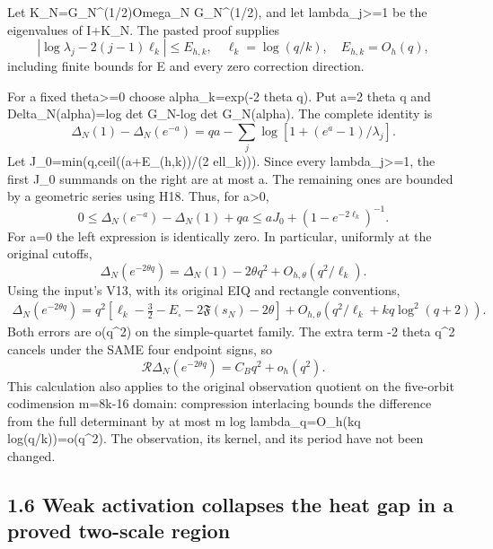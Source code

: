 Let K\_N=G\_N\^{}(1/2)Omega\_N G\_N\^{}(1/2), and let lambda\_j\textgreater=1 be the eigenvalues of I+K\_N. The pasted proof supplies \[
 |\log\lambda_j-2(j-1)\ell_k|\le E_{h,k},\quad
 \ell_k=\log(q/k),\quad E_{h,k}=O_h(q),
 \tag{H18}
\] including finite bounds for E and every zero correction direction.

For a fixed theta\textgreater=0 choose alpha\_k=exp(-2 theta q). Put a=2 theta q and Delta\_N(alpha)=log det G\_N-log det G\_N(alpha). The complete identity is \[
 \Delta_N(1)-\Delta_N(e^{-a})=qa-\sum_j\log[1+(e^a-1)/\lambda_j].
 \tag{H19}
\] Let J\_0=min(q,ceil((a+E\_(h,k))/(2 ell\_k))). Since every lambda\_j\textgreater=1, the first J\_0 summands on the right are at most a. The remaining ones are bounded by a geometric series using H18. Thus, for a\textgreater0, \[
 \boxed{0\le\Delta_N(e^{-a})-\Delta_N(1)+qa
 \le aJ_0+(1-e^{-2\ell_k})^{-1}.}\tag{H20}
\] For a=0 the left expression is identically zero. In particular, uniformly at the original cutoffs, \[
 \boxed{\Delta_N(e^{-2\theta q})
 =\Delta_N(1)-2\theta q^2+O_{h,\theta}(q^2/\ell_k).}\tag{H21}
\] Using the input's V13, with its original EIQ and rectangle conventions, \[
 \boxed{\begin{aligned}
 \Delta_N(e^{-2\theta q})
 =q^2[\ell_k-\tfrac32-E_\square-2\mathfrak F(s_N)-2\theta]
 +O_{h,\theta}(q^2/\ell_k+kq\log^2(q+2)).
 \end{aligned}}\tag{H22}
\] Both errors are o(q\^{}2) on the simple-quartet family. The extra term -2 theta q\^{}2 cancels under the SAME four endpoint signs, so \[
 \boxed{\mathcal R\Delta_N(e^{-2\theta q})=C_Bq^2+o_h(q^2).}\tag{H23}
\] This calculation also applies to the original observation quotient on the five-orbit codimension m=8k-16 domain: compression interlacing bounds the difference from the full determinant by at most m log lambda\_q=O\_h(kq log(q/k))=o(q\^{}2). The observation, its kernel, and its period have not been changed.

\subsection{1.6 Weak activation collapses the heat gap in a proved two-scale region}\label{weak-activation-collapses-the-heat-gap-in-a-proved-two-scale-region}

